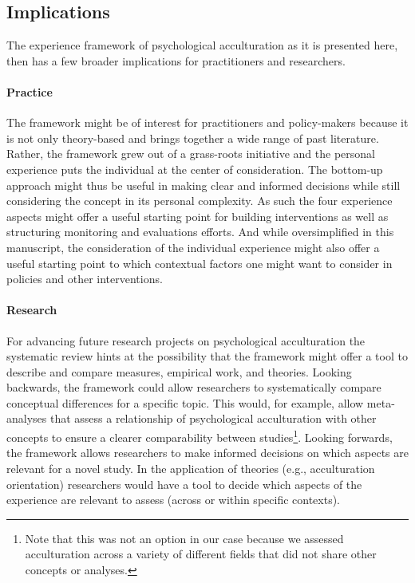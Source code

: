 \documentclass[man, 12pt, a4paper]{apa7}
\begin{document}
\subsection{Implications}
The experience framework of psychological acculturation as it is presented here, then has a few broader implications for practitioners and researchers. 

\paragraph{Practice} The framework might be of interest for practitioners and policy-makers because it is not only theory-based and brings together a wide range of past literature. Rather, the framework grew out of a grass-roots initiative and the personal experience puts the individual at the center of consideration. The bottom-up approach might thus be useful in making clear and informed decisions while still considering the concept in its personal complexity. As such the four experience aspects might offer a useful starting point for building interventions as well as structuring monitoring and evaluations efforts. And while oversimplified in this manuscript, the consideration of the individual experience might also offer a useful starting point to which contextual factors one might want to consider in policies and other interventions.

\paragraph{Research} For advancing future research projects on psychological acculturation the systematic review hints at the possibility that the framework might offer a tool to describe and compare measures, empirical work, and theories. Looking backwards, the framework could allow researchers to systematically compare conceptual differences for a specific topic. This would, for example, allow meta-analyses that assess a relationship of psychological acculturation with other concepts to ensure a clearer comparability between studies\footnote{Note that this was not an option in our case because we assessed acculturation across a variety of different fields that did not share other concepts or analyses.}. Looking forwards, the framework allows researchers to make informed decisions on which aspects are relevant for a novel study. In the application of theories (e.g., acculturation orientation) researchers would have a tool to decide which aspects of the experience are relevant to assess (across or within specific contexts).
\end{document}
